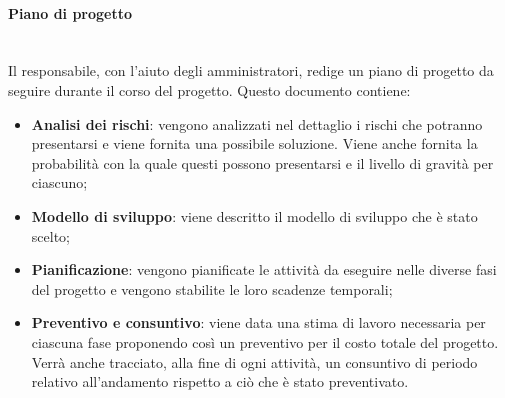 		\paragraph{Piano di progetto} \mbox{}\\
		Il responsabile, con l'aiuto degli amministratori, redige un piano di progetto da seguire durante il corso del progetto. Questo documento contiene:
		\begin{itemize}
			\item \textbf{Analisi dei rischi}: vengono analizzati nel dettaglio i rischi che potranno presentarsi e viene fornita una possibile soluzione. Viene anche fornita la probabilità con la quale questi possono presentarsi e il livello di gravità per ciascuno;
			\item \textbf{Modello di sviluppo}: viene descritto il modello di sviluppo che è stato scelto;
			\item \textbf{Pianificazione}: vengono pianificate le attività da eseguire nelle diverse fasi del progetto e vengono stabilite le loro scadenze temporali;
			\item \textbf{Preventivo e consuntivo}: viene data una stima di lavoro necessaria per ciascuna fase proponendo così un preventivo per il costo totale del progetto. Verrà anche tracciato, alla fine di ogni attività, un consuntivo di periodo relativo all'andamento rispetto a ciò che è stato preventivato.
		\end{itemize}
